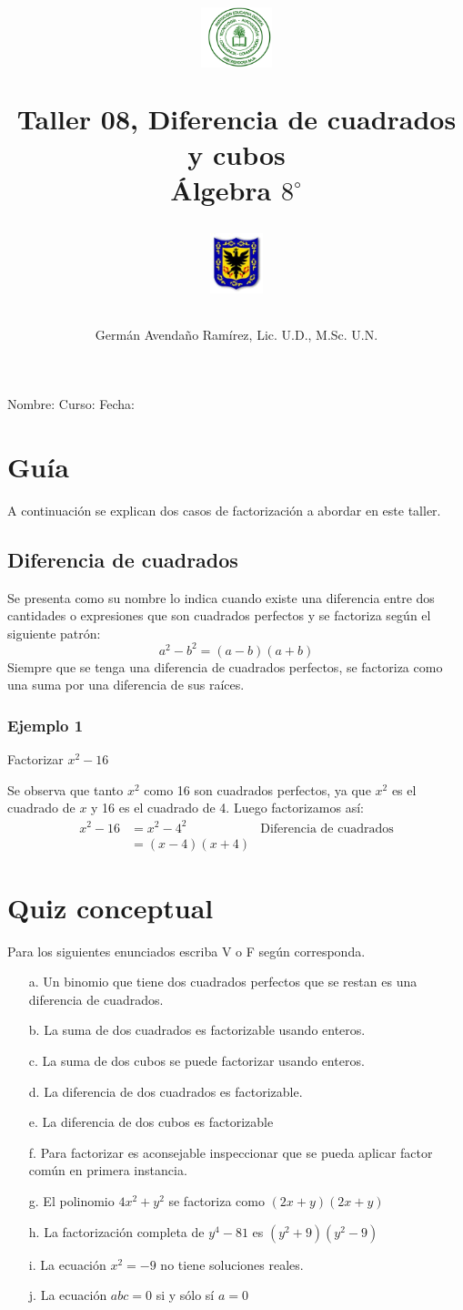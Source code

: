 \documentclass[10pt,twoside]{article}
\author{Germ\'an Avenda\~no Ram\'irez, Lic. U.D., M.Sc. U.N.}
\title{\begin{minipage}{.2\textwidth}
\includegraphics[height=1.75cm]{Images/logo-colegio.png}\end{minipage}
\begin{minipage}{.55\textwidth}
\begin{center}
Taller 08, Diferencia de cuadrados y cubos\\
Álgebra $8^{\circ}$
\end{center}
\end{minipage}\hfill
\begin{minipage}{.2\textwidth}
\includegraphics[height=1.75cm]{Images/logo-sed.png} 
\end{minipage}}
\date{}
\begin{document}
\maketitle
Nombre: \hrulefill Curso: \underline{\hspace*{44pt}} Fecha: \underline{\hspace*{2.5cm}}
\section*{Gu\'{i}a}
A continuaci\'{o}n se explican dos casos de factorizaci\'{o}n a abordar en este taller.
\subsection*{Diferencia de cuadrados}
Se presenta como su nombre lo indica cuando existe una diferencia entre dos cantidades o expresiones que son cuadrados perfectos y se factoriza seg\'{u}n el siguiente patr\'{o}n:
\[a^{2}-b^{2}=(a-b)(a+b)\]
Siempre que se tenga una diferencia de cuadrados perfectos, se factoriza como una suma por una diferencia de sus ra\'{i}ces.
\subsubsection*{Ejemplo 1}
Factorizar $x^{2}-16$

Se observa que tanto $x^{2}$ como 16 son cuadrados perfectos, ya que $x^{2}$ es el cuadrado de $x$ y 16 es el cuadrado de 4. Luego factorizamos as\'{i}:
\begin{align*}
x^{2}-16&=x^{2}-4^{2} & \mbox{Diferencia de cuadrados}\\
&=(x-4)(x+4)
\end{align*}
\section*{Quiz conceptual}
Para los siguientes enunciados escriba V o F según corresponda.
\begin{enumerate}
\item[a.] Un binomio que tiene dos cuadrados perfectos que se restan es una diferencia de cuadrados.
\item[b.] La suma de dos cuadrados es factorizable usando enteros.
\item[c.] La suma de dos cubos se puede factorizar usando enteros.
\item[d.] La diferencia de dos cuadrados es factorizable.
\item[e.] La diferencia de dos cubos es factorizable
\item[f.] Para factorizar es aconsejable inspeccionar que se pueda aplicar factor común en primera instancia.
\item[g.] El polinomio $4x^{2}+y^{2}$ se factoriza como $(2x+y)(2x+y)$
\item[h.] La factorización completa de $y^{4}-81$ es $(y^{2}+9)(y^{2}-9)$
\item[i.] La ecuación $x^{2}=-9$ no tiene soluciones reales.
\item[j.] La ecuación $abc=0$ si y sólo sí $a=0$ 
\end{enumerate}
\end{document}
